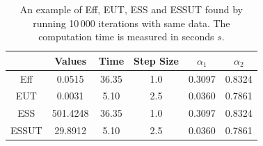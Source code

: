 \begin{table}[h]
\centering
\begin{tabular}{|c|c|c|c|c|c|}
\hline
          & Values     & Time & Step Size & $\alpha_1$ & $\alpha_2$ \\ \hline
Eff      & 0.0515     & 36.35 & 1.0   & 0.3097    & 0.8324    \\ \hline
EUT    & 0.0031     & 5.10   & 2.5   & 0.0360   & 0.7861   \\ \hline
ESS     & 501.4248 & 36.35 & 1.0   & 0.3097    & 0.8324     \\ \hline
ESSUT & 29.8912   & 5.10   & 2.5   & 0.0360   & 0.7861    \\ \hline
\end{tabular}
\caption{An example of Eff, EUT, ESS and ESSUT found by running 10\,000 iterations with same data. The computation time is measured in seconds $s$. }
\label{effeutessessutexampletable}
\end{table}


